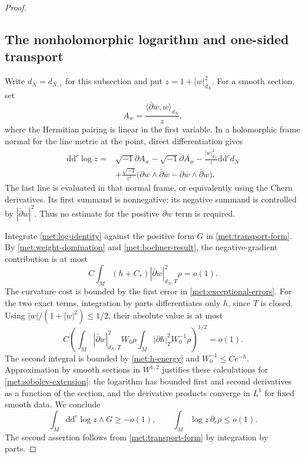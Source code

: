 \documentclass[11pt,letterpaper]{article}
\theoremstyle{definition}
\theoremstyle{remark}
\begin{document}
\begin{proof}
\subsection*{The nonholomorphic logarithm and one-sided transport}

Write \(d_N=d_{N,\varepsilon}\) for this subsection and put
\(z=1+|w|_{d_N}^2\).  For a smooth section, set
\[
 A_w=\frac{\langle\bar\partial w,w\rangle_{d_N}}z,
\]
where the Hermitian pairing is linear in the first variable.  In a
holomorphic frame normal for the line metric at the point, direct
differentiation gives
\begin{equation}
 \label{met:log-identity}
 \begin{split}
 \mathrm{d}\mathrm{d}^{c}\log z={}&\sqrt{-1}\partial A_w
       -\sqrt{-1}\bar\partial\overline{A_w}
       -\frac{|w|_{d_N}^2}{z}\mathrm{d}\mathrm{d}^{c} d_N\\
 &+\frac{\sqrt{-1}}{z^2}
       \bigl(\partial w\wedge\bar\partial\bar w
                 -\partial\bar w\wedge\bar\partial w\bigr).
 \end{split}
\end{equation}
The last line is evaluated in that normal frame, or equivalently
using the Chern derivatives.  Its first summand is nonnegative; its
negative summand is controlled by \(|\bar\partial w|^2\).  Thus no
estimate for the positive \(\partial w\) term is required.

Integrate \eqref{met:log-identity} against the positive form \(G\)
in \eqref{met:transport-form}.  By
\eqref{met:weight-domination} and \eqref{met:bochner-result}, the
negative-gradient contribution is at most
\[
 C\int_M(h+C_*)|\bar\partial w|_{d_N,T}^2\rho=o(1).
\]
The curvature cost is bounded by the first error in
\eqref{met:exceptional-errors}.  For the two exact terms, integration
by parts differentiates only \(h\), since \(T\) is closed.  Using
\(|w|/(1+|w|^2)\leq1/2\), their absolute value is at most
\begin{equation}
 \label{met:log-exact-errors}
 C\left(
   \int_M|\bar\partial w|_{d_N,T}^2W_0\rho
   \int_M|\partial h|_T^2W_0^{-1}\rho
       \right)^{1/2}=o(1).
\end{equation}
The second integral is bounded by \eqref{met:h-energy} and
\(W_0^{-1}\leq C e^{-h}\).  Approximation by smooth sections in
\(W^{1,2}\) justifies these calculations for
\eqref{met:sobolev-extension}: the logarithm has bounded first and
second derivatives as a function of the section, and the derivative
products converge in \(L^1\) for fixed smooth data.  We conclude
\begin{equation}
 \label{met:log-integral}
 \int_M\mathrm{d}\mathrm{d}^{c}\log z\wedge G\geq-o(1),
 \qquad
 \int_M\log z\,\partial_c\rho\leq o(1).
\end{equation}
The second assertion follows from \eqref{met:transport-form} by
integration by parts.


\end{proof}
\end{document}
